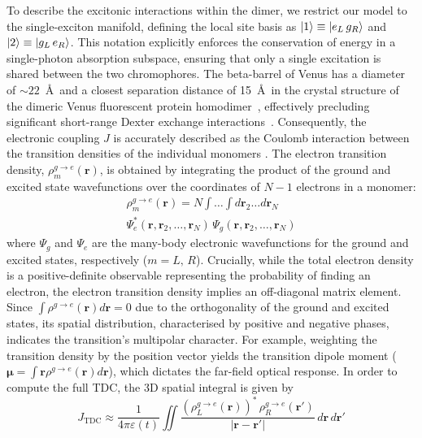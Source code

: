 \documentclass[journal=jpcbfk, manuscript=article, layout=twocolumn, doi=true]{achemso}
\begin{document}
To describe the excitonic interactions within the dimer, we restrict our model to the single-exciton manifold, defining the local site basis as $\ket{1}\equiv\ket{e_L \, g_R}$ and $\ket{2}\equiv\ket{g_L \, e_R}$. This notation explicitly enforces the conservation of energy in a single-photon absorption subspace, ensuring that only a single excitation is shared between the two chromophores. The beta-barrel of Venus has a diameter of $\sim 22$~\AA\ and a closest separation distance of 15~\AA\ in the crystal structure of the dimeric Venus fluorescent protein homodimer~\cite{kim2019venusa206}, effectively precluding significant short-range Dexter exchange interactions~\cite{skourtis2016dexter}. Consequently, the electronic coupling $J$ is accurately described as the Coulomb interaction between the transition densities of the individual monomers \cite{hsu2009}. The electron transition density, $\rho^{g\to e}_m(\mathbf r)$, is obtained by integrating the product of the ground and excited state wavefunctions over the coordinates of $N-1$ electrons in a monomer:
\begin{multline} \label{eq:transition_density}
    \rho^{g\to e}_m(\mathbf{r}) =  
    N \int \dots \int d\mathbf{r}_2 \dots d\mathbf{r}_N \\ \Psi_e^*(\mathbf{r}, \mathbf{r}_2, \dots, \mathbf{r}_N) \, \Psi_g(\mathbf{r}, \mathbf{r}_2, \dots, \mathbf{r}_N)
\end{multline}
where $\Psi_g$ and $\Psi_e$ are the many-body electronic wavefunctions for the ground and excited states, respectively ($m=L,\,R$). 
Crucially, while the total electron density is a positive-definite observable representing the probability of finding an electron, the electron transition density implies an off-diagonal matrix element. Since $\int \rho^{g\to e}(\mathbf{r}) d\mathbf{r} = 0$ due to the orthogonality of the ground and excited states, its spatial distribution, characterised by positive and negative phases, indicates the transition's multipolar character. For example, weighting the transition density by the position vector yields the transition dipole moment ($\boldsymbol{\mu} = \int \mathbf{r} \rho^{g \to e}(\mathbf{r}) d\mathbf{r}$), which dictates the far-field optical response. In order to compute the full TDC, the 3D spatial integral is given by 
\begin{equation}
    J_{\mathrm{TDC}} \approx \frac{1}{4\pi\varepsilon(t)}\iint \frac{\left(\rho^{g\to e}_L(\mathbf r)\right)^*\,\rho^{g\to e}_R(\mathbf r')}{|\mathbf r-\mathbf r'|} \,d\mathbf r\,d\mathbf r'
    \label{eq:J_integral}
\end{equation}
\end{document}
